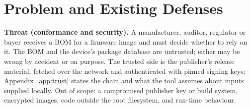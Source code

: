 \documentclass[sigconf,nonacm]{acmart}
\begin{document}
\section{Problem and Existing Defenses}
\label{sec:problem}

\textbf{Threat (conformance and security).} A manufacturer, auditor, regulator or buyer receives a BOM for a firmware image and must decide whether to rely on it. The BOM and the device's package database are untrusted; either may be wrong by accident or on purpose. The trusted side is the publisher's release material, fetched over the network and authenticated with pinned signing keys; Appendix~\ref{app:trust} states the chain and what the tool assumes about inputs supplied locally. Out of scope: a compromised publisher key or build system, encrypted images, code outside the root filesystem, and run-time behaviour.
\end{document}
